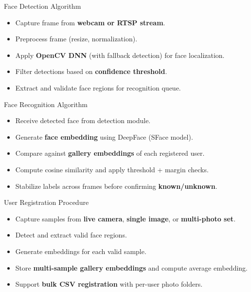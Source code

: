 \documentclass[10pt]{beamer}
\begin{document}
\begin{frame}{Face Detection Algorithm}

\begin{itemize}
    \item Capture frame from \textbf{webcam or RTSP stream}.
    
    \item Preprocess frame (resize, normalization).
    
    \item Apply \textbf{OpenCV DNN} (with fallback detection) for face localization.
    
    \item Filter detections based on \textbf{confidence threshold}.
    
    \item Extract and validate face regions for recognition queue.
\end{itemize}

\end{frame}
\begin{frame}{Face Recognition Algorithm}

\begin{itemize}
    \item Receive detected face from detection module.
    
    \item Generate \textbf{face embedding} using DeepFace (SFace model).
    \item Compare against \textbf{gallery embeddings} of each registered user.
    \item Compute cosine similarity and apply threshold + margin checks.
    \item Stabilize labels across frames before confirming \textbf{known/unknown}.
\end{itemize}

\end{frame}
\begin{frame}{User Registration Procedure}

\begin{itemize}
    \item Capture samples from \textbf{live camera}, \textbf{single image}, or \textbf{multi-photo set}.
    
    \item Detect and extract valid face regions.
    
    \item Generate embeddings for each valid sample.
    
    \item Store \textbf{multi-sample gallery embeddings} and compute average embedding.
    
    \item Support \textbf{bulk CSV registration} with per-user photo folders.
\end{itemize}

\end{frame}
\end{document}
